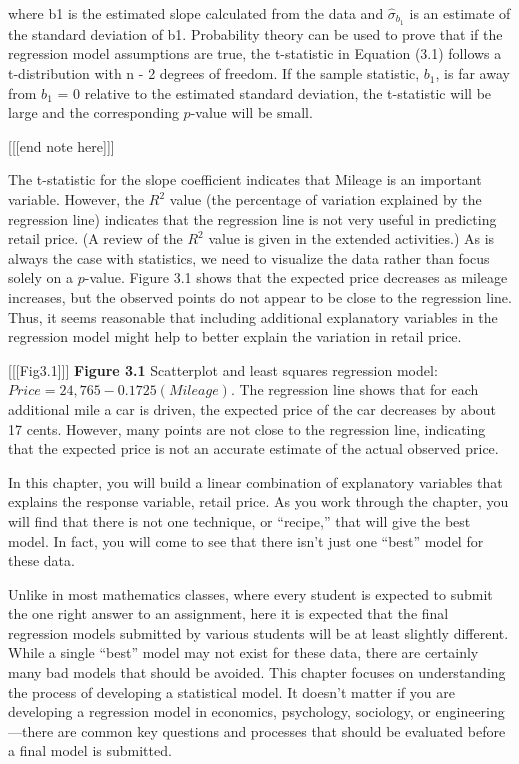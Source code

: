 \documentclass[
]{report}
\begin{document}
where b1 is the estimated slope calculated from the data and \(\hat{\sigma}_{b_1}\) is an estimate of the standard deviation of b1. Probability theory can be used to prove that if the regression model assumptions are true, the t-statistic in Equation (3.1) follows a t-distribution with n - 2 degrees of freedom. If the sample statistic, \(b_1\), is far away from \(b_1\) = 0 relative to the estimated standard deviation, the t-statistic will be large and the corresponding \(p\)-value will be small.

{[}{[}{[}end note here{]}{]}{]}

The t-statistic for the slope coefficient indicates that Mileage is an important variable. However, the \(R^2\) value (the percentage of variation explained by the regression line) indicates that the regression line is not very useful in predicting retail price. (A review of the \(R^2\) value is given in the extended activities.) As is always the case with statistics, we need to visualize the data rather than focus solely on a \(p\)-value. Figure 3.1 shows that the expected price decreases as mileage increases, but the observed points do not appear to be close to the regression line. Thus, it seems reasonable that including additional explanatory variables in the regression model might help to better explain the variation in retail price.

{[}{[}{[}Fig3.1{]}{]}{]}
\textbf{Figure 3.1} Scatterplot and least squares regression model: \(Price = 24,765 - 0.1725(Mileage)\). The regression line shows that for each additional mile a car is driven, the expected price of the car decreases by about 17 cents. However, many points are not close to the regression line, indicating that the expected price is not an accurate estimate of the actual observed price.

In this chapter, you will build a linear combination of explanatory variables that explains the response variable, retail price. As you work through the chapter, you will find that there is not one technique, or ``recipe,'' that will give the best model. In fact, you will come to see that there isn't just one ``best'' model for these data.

Unlike in most mathematics classes, where every student is expected to submit the one right answer to an assignment, here it is expected that the final regression models submitted by various students will be at least slightly different. While a single ``best'' model may not exist for these data, there are certainly many bad models that should be avoided. This chapter focuses on understanding the process of developing a statistical
model. It doesn't matter if you are developing a regression model in economics, psychology, sociology, or engineering---there are common key questions and processes that should be evaluated before a final model is submitted.
\end{document}
